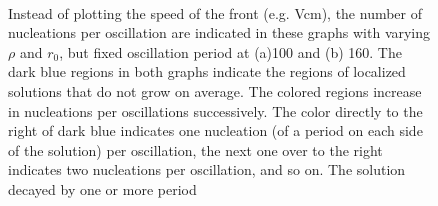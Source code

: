 \documentclass[pre,preprint,superscriptaddress]{revtex4-1}
\begin{document}
\begin{figure}[!htb]
\begin{center}
    \mbox{
       \quad
      }
    \caption{Instead of plotting the speed of the front (e.g. Vcm), the number of nucleations per oscillation are indicated in these graphs with varying $\rho$ and $r_0$, but fixed oscillation period at (a)100 and (b) 160.  The dark blue regions in both graphs indicate the regions of localized solutions that do not grow on average.  The colored regions increase in nucleations per oscillations successively.  The color directly to the right of dark blue indicates one nucleation (of a period on each side of the solution) per oscillation, the next one over to the right indicates two nucleations per oscillation, and so on.  The solution decayed by one or more period  }
    \label{fig:NucPerOscT}
  \end{center}
\end{figure} 
\end{document}
